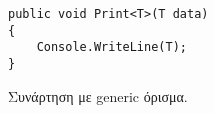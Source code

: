 \begin{listing}[H]
\begin{verbatim}
public void Print<T>(T data)
{
    Console.WriteLine(T);
}
\end{verbatim}
\caption{Συνάρτηση με generic όρισμα.}
\label{genericsMethod}
\end{listing}